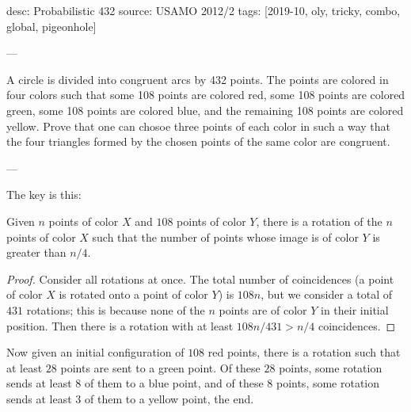 desc: Probabilistic 432
source: USAMO 2012/2
tags: [2019-10, oly, tricky, combo, global, pigeonhole]

---

A circle is divided into congruent arcs by 432 points. The points are colored in four colors such that some 108 points are colored red, some 108 points are colored green, some 108 points are colored blue, and the remaining 108 points are colored yellow. Prove that one can chosoe three points of each color in such a way that the four triangles formed by the chosen points of the same color are congruent.

---

The key is this:
\begin{claim*}
    Given $n$ points of color $X$ and $108$ points of color $Y$, there is a rotation of the $n$ points of color $X$ such that the number of points whose image is of color $Y$ is greater than $n/4$.
\end{claim*}
\begin{proof}
    Consider all rotations at once. The total number of coincidences (a point of color $X$ is rotated onto a point of color $Y$) is $108n$, but we consider a total of $431$ rotations; this is because none of the $n$ points are of color $Y$ in their initial position. Then there is a rotation with at least $108n/431>n/4$ coincidences.
\end{proof}

Now given an initial configuration of $108$ red points, there is a rotation such that at least $28$ points are sent to a green point. Of these $28$ points, some rotation sends at least $8$ of them to a blue point, and of these $8$ points, some rotation sends at least $3$ of them to a yellow point, the end.
